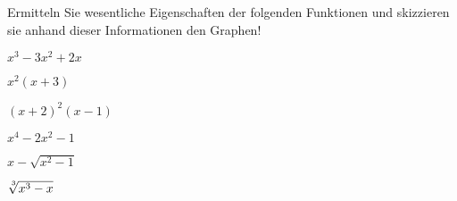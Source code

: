 \item Ermitteln Sie wesentliche Eigenschaften der folgenden Funktionen und skizzieren sie anhand dieser Informationen den Graphen!
\begin{enumerate}
\begin{multicols}{3}
\item $x^3-3x^2+2x$ 
\item $x^2(x+3)$
\item $(x+2)^2(x-1)$
\item $x^4-2x^2-1$
\item $x-\sqrt{x^2-1}$
\item $\nroot{3}{x^3-x}$
\end{multicols}
\end{enumerate}
